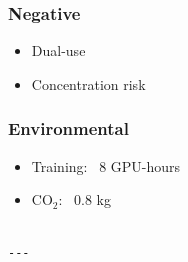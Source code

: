 \subsubsection{Negative}
\begin{itemize}
\item Dual-use
\item Concentration risk

\end{itemize}
\subsubsection{Environmental}
\begin{itemize}
\item Training: ~8 GPU-hours
\item CO$_2$: ~0.8 kg
\end{itemize}
\begin{lstlisting}

---
\end{lstlisting}